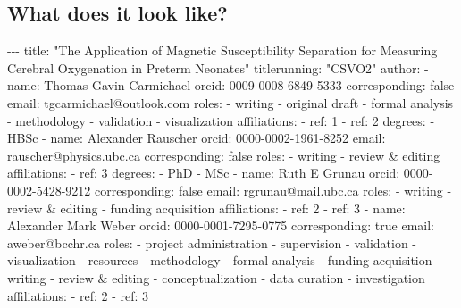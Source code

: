 \documentclass[
  letterpaper,
  DIV=11,
  numbers=noendperiod]{scrartcl}
\newenvironment{Shaded}{\begin{snugshade}}{\end{snugshade}}
\newcommand{\NormalTok}[1]{\textcolor[rgb]{0.00,0.23,0.31}{#1}}
\begin{document}
\subsection{What does it look like?}\label{what-does-it-look-like}

\begin{Shaded}
\begin{Highlighting}[]
\NormalTok{{-}{-}{-}}
\NormalTok{title: "The Application of Magnetic Susceptibility Separation for Measuring Cerebral Oxygenation in Preterm Neonates"}
\NormalTok{titlerunning: "CSVO2"}
\NormalTok{author:}
\NormalTok{  {-} name: Thomas Gavin Carmichael}
\NormalTok{    orcid: 0009{-}0008{-}6849{-}5333}
\NormalTok{    corresponding: false}
\NormalTok{    email: tgcarmichael@outlook.com}
\NormalTok{    roles:}
\NormalTok{      {-} writing {-} original draft}
\NormalTok{      {-} formal analysis}
\NormalTok{      {-} methodology}
\NormalTok{      {-} validation}
\NormalTok{      {-} visualization}
\NormalTok{    affiliations:}
\NormalTok{      {-} ref: 1}
\NormalTok{      {-} ref: 2}
\NormalTok{    degrees:}
\NormalTok{      {-} HBSc}
\NormalTok{  {-} name: Alexander Rauscher}
\NormalTok{    orcid: 0000{-}0002{-}1961{-}8252}
\NormalTok{    email: rauscher@physics.ubc.ca}
\NormalTok{    corresponding: false}
\NormalTok{    roles:}
\NormalTok{      {-} writing {-} review \& editing}
\NormalTok{    affiliations:}
\NormalTok{      {-} ref: 3}
\NormalTok{    degrees:}
\NormalTok{      {-} PhD}
\NormalTok{      {-} MSc}
\NormalTok{  {-} name: Ruth E Grunau}
\NormalTok{    orcid: 0000{-}0002{-}5428{-}9212}
\NormalTok{    corresponding: false}
\NormalTok{    email: rgrunau@mail.ubc.ca}
\NormalTok{    roles:}
\NormalTok{      {-} writing {-} review \& editing}
\NormalTok{      {-} funding acquisition}
\NormalTok{    affiliations:}
\NormalTok{      {-} ref: 2}
\NormalTok{      {-} ref: 3}
\NormalTok{  {-} name: Alexander Mark Weber}
\NormalTok{    orcid: 0000{-}0001{-}7295{-}0775}
\NormalTok{    corresponding: true}
\NormalTok{    email: aweber@bcchr.ca}
\NormalTok{    roles:}
\NormalTok{      {-} project administration}
\NormalTok{      {-} supervision}
\NormalTok{      {-} validation}
\NormalTok{      {-} visualization}
\NormalTok{      {-} resources}
\NormalTok{      {-} methodology}
\NormalTok{      {-} formal analysis}
\NormalTok{      {-} funding acquisition}
\NormalTok{      {-} writing {-} review \& editing}
\NormalTok{      {-} conceptualization}
\NormalTok{      {-} data curation}
\NormalTok{      {-} investigation}
\NormalTok{    affiliations:}
\NormalTok{      {-} ref: 2}
\NormalTok{      {-} ref: 3}

\end{Highlighting}
\end{Shaded}
\end{document}

